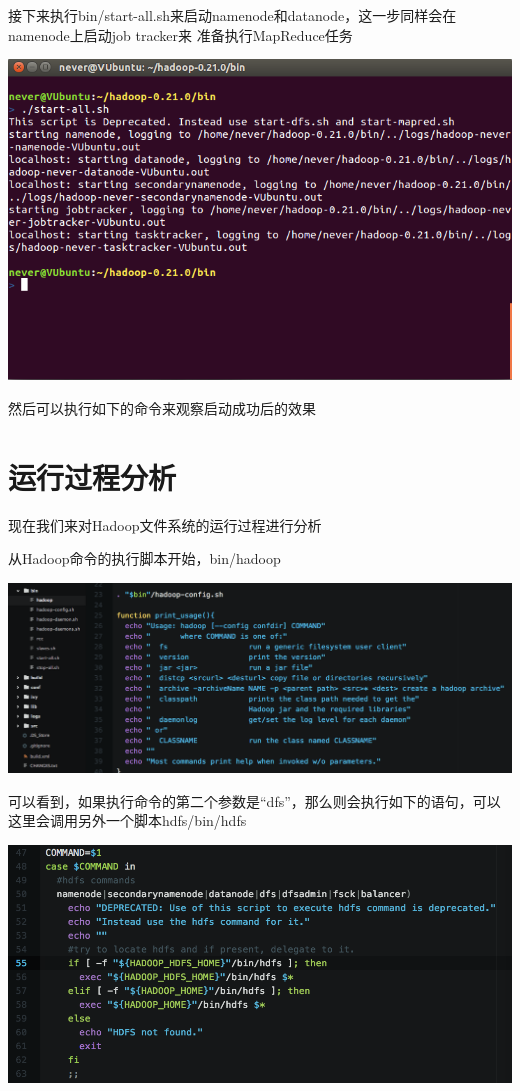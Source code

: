 接下来执行bin/start-all.sh来启动namenode和datanode，这一步同样会在namenode上启动job tracker来
准备执行MapReduce任务

\includegraphics[width=\textwidth]{image/env/cr15.png}

然后可以执行如下的命令来观察启动成功后的效果

\section{运行过程分析}

现在我们来对Hadoop文件系统的运行过程进行分析

从Hadoop命令的执行脚本开始，bin/hadoop

\includegraphics[width=\textwidth]{image/env/cr16.png}

可以看到，如果执行命令的第二个参数是``dfs''，那么则会执行如下的语句，可以这里会调用另外一个脚本hdfs/bin/hdfs

\includegraphics[width=\textwidth]{image/env/cr17.png}

